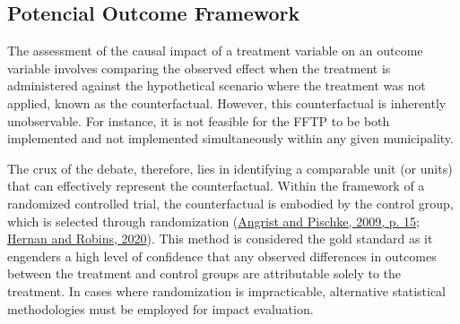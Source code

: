 \documentclass[12pt, a4paper, twoside]{article}
\numberwithin{equation}{subsection} %
\begin{document}
\hypertarget{sec-po}{%
\subsection{Potencial Outcome Framework}\label{sec-po}}

The assessment of the causal impact of a treatment variable on an
outcome variable involves comparing the observed effect when the
treatment is administered against the hypothetical scenario where the
treatment was not applied, known as the counterfactual. However, this
counterfactual is inherently unobservable. For instance, it is not
feasible for the FFTP to be both implemented and not implemented
simultaneously within any given municipality.

The crux of the debate, therefore, lies in identifying a comparable unit
(or units) that can effectively represent the counterfactual. Within the
framework of a randomized controlled trial, the counterfactual is
embodied by the control group, which is selected through randomization
(\protect\hyperlink{ref-mostly_harmless_econometrics}{Angrist and
Pischke, 2009, p. 15}; \protect\hyperlink{ref-Hernan2020}{Hernan and
Robins, 2020}). This method is considered the gold standard as it
engenders a high level of confidence that any observed differences in
outcomes between the treatment and control groups are attributable
solely to the treatment. In cases where randomization is impracticable,
alternative statistical methodologies must be employed for impact
evaluation.
\end{document}

